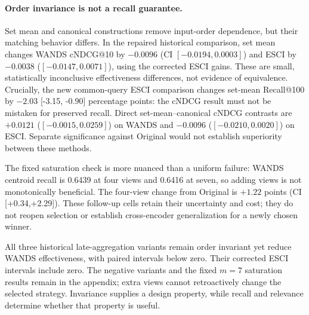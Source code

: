 \paragraph{Order invariance is not a recall guarantee.}
Set mean and canonical constructions remove input-order dependence, but their matching behavior differs. In the repaired historical comparison, set mean changes WANDS cNDCG@10 by $-0.0096$ (CI $[-0.0194,0.0003]$) and ESCI by $-0.0038$ ($[-0.0147,0.0071]$), using the corrected ESCI gains. These are small, statistically inconclusive effectiveness differences, not evidence of equivalence. Crucially, the new common-query ESCI comparison changes set-mean Recall@100 by $-2.03$ [-3.15, -0.90] percentage points: the cNDCG result must not be mistaken for preserved recall. Direct set-mean--canonical cNDCG contrasts are $+0.0121$ ($[-0.0015,0.0259]$) on WANDS and $-0.0096$ ($[-0.0210,0.0020]$) on ESCI. Separate significance against Original would not establish superiority between these methods.

The fixed saturation check is more nuanced than a uniform failure: WANDS centroid recall is 0.6439 at four views and 0.6416 at seven, so adding views is not monotonically beneficial. The four-view change from Original is $+1.22$ points (CI [+0.34,+2.29]). These follow-up cells retain their uncertainty and cost; they do not reopen selection or establish cross-encoder generalization for a newly chosen winner.

All three historical late-aggregation variants remain order invariant yet reduce WANDS effectiveness, with paired intervals below zero. Their corrected ESCI intervals include zero. The negative variants and the fixed $m=7$ saturation results remain in the appendix; extra views cannot retroactively change the selected strategy. Invariance supplies a design property, while recall and relevance determine whether that property is useful.

